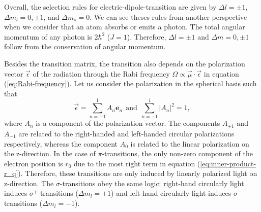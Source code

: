 Overall, the selection rules for electric-dipole-transition are given by $ \Delta l = \pm 1 $, $ \Delta m_l = 0, \pm 1 $, and $ \Delta m_s = 0 $. We can see theses rules from another perspective when we consider that an atom absorbs or emits a photon. The total angular momentum of any photon is $ 2\hbar^2 $ ($ J = 1 $). Therefore, $ \Delta l = \pm 1 $ and $ \Delta m = 0, \pm 1 $ follow from the conservation of angular momentum.

Besides the transition matrix, the transition also depends on the polarization vector $ \vec{\epsilon} $ of the radiation through the Rabi frequency $ \Omega \propto \vec{\mu} \cdot \vec{\epsilon} $ in equation (\ref{eq:Rabi-frequency}). Let us consider the polarization in the spherical basis such that
\begin{equation}
	\vec{\epsilon} = \sum_{n = -1}^{1} A_{n} \mathbf{e}_{n}\ \ \textrm{and}\ \ \sum_{n = -1}^{1} |A_{n}|^2 = 1,
	\label{eq:polarization-spherical-basis}
\end{equation}
where $ A_{n} $ is a component of the polarization vector. The components $ A_{+1} $ and $ A_{-1} $ are related to the right-handed and left-handed circular polarizations respectively, whereas the component $ A_0 $ is related to the linear polarization on the z-direction. In the case of $\pi$-transitions, the only non-zero component of the electron position is $ r_0 $ due to the most right term in equation (\ref{eq:inner-product-r_q}). Therefore, these transitions are only induced by linearly polarized light on z-direction. The $\sigma$-transitions obey the same logic: right-hand circularly light induces $\sigma^+$-transitions ($ \Delta m_l = +1 $) and left-hand circularly light induces $ \sigma^- $-transitions ($ \Delta m_l = -1 $).
